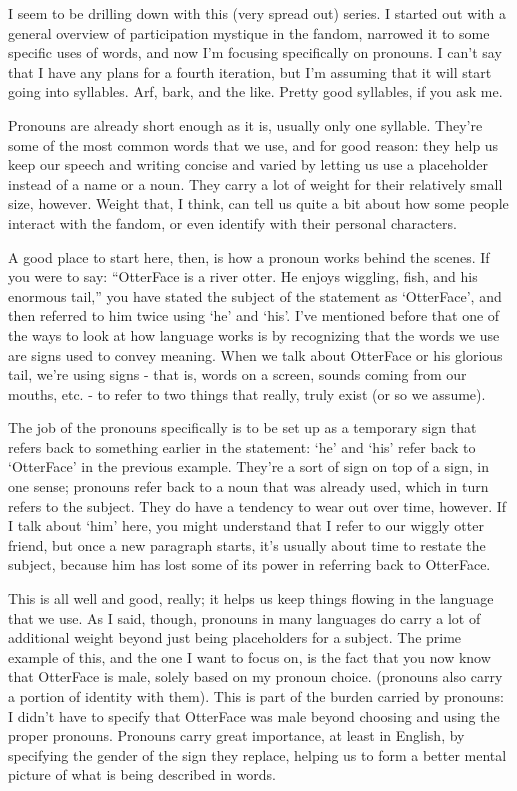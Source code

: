 
I seem to be drilling down with this (very spread out) series. I started out with a general overview of participation mystique in the fandom, narrowed it to some specific uses of words, and now I'm focusing specifically on pronouns. I can't say that I have any plans for a fourth iteration, but I'm assuming that it will start going into syllables. Arf, bark, and the like. Pretty good syllables, if you ask me.

Pronouns are already short enough as it is, usually only one syllable. They're some of the most common words that we use, and for good reason: they help us keep our speech and writing concise and varied by letting us use a placeholder instead of a name or a noun. They carry a lot of weight for their relatively small size, however. Weight that, I think, can tell us quite a bit about how some people interact with the fandom, or even identify with their personal characters.

A good place to start here, then, is how a pronoun works behind the scenes. If you were to say: ``OtterFace is a river otter. He enjoys wiggling, fish, and his enormous tail,'' you have stated the subject of the statement as `OtterFace', and then referred to him twice using `he' and `his'. I've mentioned before that one of the ways to look at how language works is by recognizing that the words we use are signs used to convey meaning. When we talk about OtterFace or his glorious tail, we're using signs - that is, words on a screen, sounds coming from our mouths, etc. - to refer to two things that really, truly exist (or so we assume).

The job of the pronouns specifically is to be set up as a temporary sign that refers back to something earlier in the statement: `he' and `his' refer back to `OtterFace' in the previous example. They're a sort of sign on top of a sign, in one sense; pronouns refer back to a noun that was already used, which in turn refers to the subject. They do have a tendency to wear out over time, however. If I talk about `him' here, you might understand that I refer to our wiggly otter friend, but once a new paragraph starts, it's usually about time to restate the subject, because him has lost some of its power in referring back to OtterFace.

This is all well and good, really; it helps us keep things flowing in the language that we use. As I said, though, pronouns in many languages do carry a lot of additional weight beyond just being placeholders for a subject. The prime example of this, and the one I want to focus on, is the fact that you now know that OtterFace is male, solely based on my pronoun choice. (pronouns also carry a portion of identity with them). This is part of the burden carried by pronouns: I didn't have to specify that OtterFace was male beyond choosing and using the proper pronouns. Pronouns carry great importance, at least in English, by specifying the gender of the sign they replace, helping us to form a better mental picture of what is being described in words.

